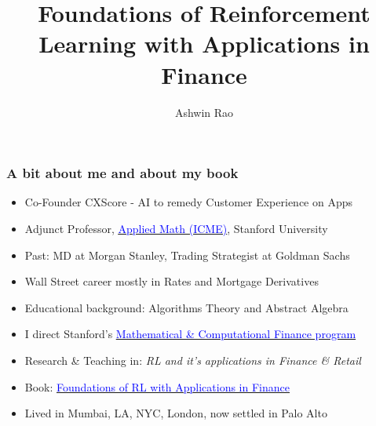 \documentclass[handout]{beamer}
\title[RL for Finance]{Foundations of Reinforcement Learning with Applications in Finance} %
\author{Ashwin Rao} %
\institute[Stanford] %
{Stanford University
}
\date{} %
\begin{document}
\begin{frame}
\titlepage %
\end{frame}



\begin{frame}
\frametitle{A bit about me and about my book}
\pause
\begin{itemize}[<+->]
\item Co-Founder CXScore - AI to remedy Customer Experience on Apps
\item Adjunct Professor, \href{https://icme.stanford.edu/}{\underline{\textcolor{blue}{Applied Math (ICME)}}}, Stanford University
\item Past: MD at Morgan Stanley, Trading Strategist at Goldman Sachs
\item Wall Street career mostly in Rates and Mortgage Derivatives
\item Educational background: Algorithms Theory and Abstract Algebra
\item I direct Stanford's \href{https://mcf.stanford.edu/}{\underline{\textcolor{blue}{Mathematical \& Computational Finance program}}}
\item Research \& Teaching in: {\em RL and it's applications in Finance \& Retail}
\item Book:  \href{https://www.routledge.com/Foundations-of-Reinforcement-Learning-with-Applications-in-Finance/Rao-Jelvis/p/book/9781032124124}{\underline{\textcolor{blue}{Foundations of RL with Applications in Finance}}}
\item Lived in Mumbai, LA, NYC, London, now settled in Palo Alto

\end{itemize}
\end{frame}
\end{document}
